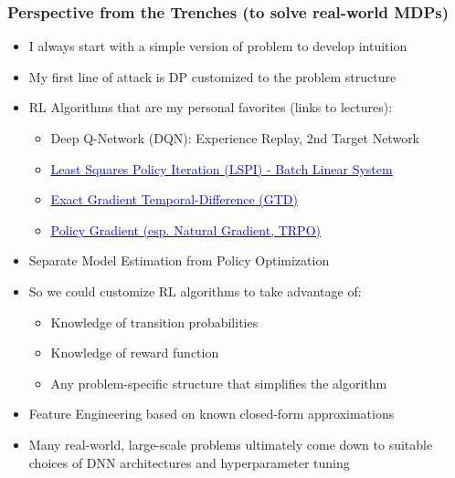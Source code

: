 \documentclass[handout]{beamer}
\begin{document}
\begin{frame}
\frametitle{Perspective from the Trenches (to solve real-world MDPs)}
\pause
\begin{itemize}[<+->]
\item I always start with a simple version of problem to develop intuition
\item My first line of attack is DP customized to the problem structure
\item RL Algorithms that are my personal favorites (links to lectures):
\begin{itemize}
\item Deep Q-Network (DQN): Experience Replay, 2nd Target Network
\item \href{https://github.com/coverdrive/technical-documents/blob/master/finance/cme241/ValueFunctionGeometry.pdf}{\underline{\textcolor{blue}{Least Squares Policy Iteration (LSPI) - Batch Linear System}}}
\item \href {https://github.com/coverdrive/technical-documents/blob/master/finance/cme241/ValueFunctionGeometry.pdf}{\underline{\textcolor{blue}{Exact Gradient Temporal-Difference (GTD)}}}
\item \href{https://github.com/coverdrive/technical-documents/blob/master/finance/cme241/PolicyGradient.pdf}{\underline{\textcolor{blue}{Policy Gradient (esp. Natural Gradient, TRPO)}}}
\end{itemize}
\item Separate Model Estimation from Policy Optimization
\item So we could customize RL algorithms to take advantage of:
\begin{itemize}
\item Knowledge of transition probabilities
\item Knowledge of reward function
\item Any problem-specific structure that simplifies the algorithm
\end{itemize}
\item Feature Engineering based on known closed-form approximations
\item Many real-world, large-scale problems ultimately come down to
suitable choices of DNN architectures and hyperparameter tuning
\end{itemize}
\end{frame}
\end{document}
